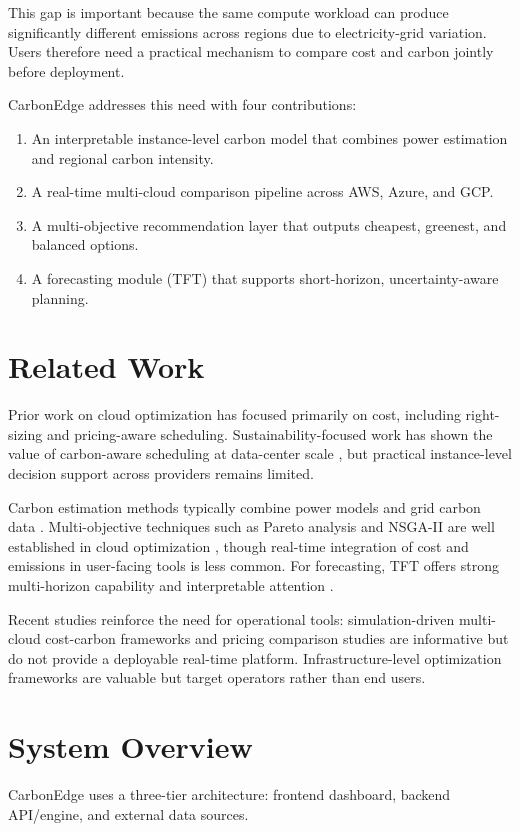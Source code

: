 \documentclass[12pt]{article}
\begin{document}
This gap is important because the same compute workload can produce significantly different emissions across regions due to electricity-grid variation. Users therefore need a practical mechanism to compare cost and carbon jointly before deployment.

CarbonEdge addresses this need with four contributions:
\begin{enumerate}
    \item An interpretable instance-level carbon model that combines power estimation and regional carbon intensity.
    \item A real-time multi-cloud comparison pipeline across AWS, Azure, and GCP.
    \item A multi-objective recommendation layer that outputs cheapest, greenest, and balanced options.
    \item A forecasting module (TFT) that supports short-horizon, uncertainty-aware planning.
\end{enumerate}

\section{Related Work}
Prior work on cloud optimization has focused primarily on cost, including right-sizing and pricing-aware scheduling. Sustainability-focused work has shown the value of carbon-aware scheduling at data-center scale \citep{b3,b4}, but practical instance-level decision support across providers remains limited.

Carbon estimation methods typically combine power models and grid carbon data \citep{b9,b10,b11}. Multi-objective techniques such as Pareto analysis and NSGA-II are well established in cloud optimization \citep{b13,b14}, though real-time integration of cost and emissions in user-facing tools is less common. For forecasting, TFT offers strong multi-horizon capability and interpretable attention \citep{b15,b16}.

Recent studies reinforce the need for operational tools: simulation-driven multi-cloud cost-carbon frameworks \citep{b17} and pricing comparison studies \citep{b18} are informative but do not provide a deployable real-time platform. Infrastructure-level optimization frameworks \citep{b19} are valuable but target operators rather than end users.

\section{System Overview}
CarbonEdge uses a three-tier architecture: frontend dashboard, backend API/engine, and external data sources.
\end{document}

